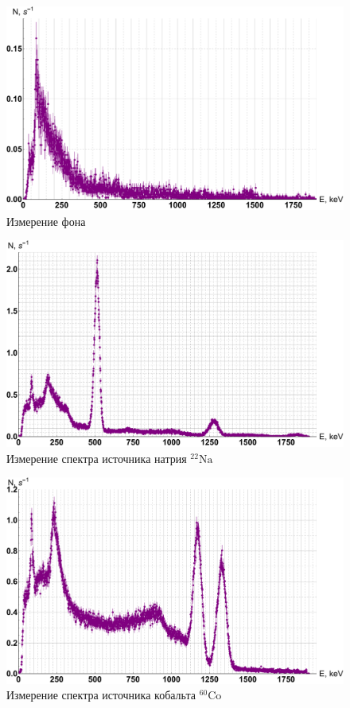\documentclass[12pt]{kiarticle}
\begin{document}
	\begin{figure}[H]
		\label{graf_bg}
		\includegraphics[scale=0.5]{bg.pdf}
		\caption{Измерение фона}
	\end{figure} 	
	
	\begin{figure}[H]
		\label{graf_na}
		\includegraphics[scale=0.5]{na.pdf}
		\caption{Измерение спектра источника натрия $ \mathrm{^{22}Na} $}
	\end{figure} 

\begin{figure}[H]
	\label{graf_co}
	\includegraphics[scale=0.5]{co.pdf}
	\caption{Измерение спектра источника кобальта $ \mathrm{^{60}Co} $}
\end{figure} 
\end{document}
